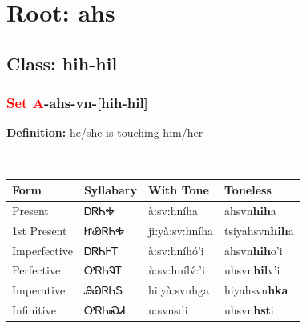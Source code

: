 \needspace{4in}
\section*{Root: ahs}
\nopagebreak
{}
\needspace{3in}
\subsection*{Class: hih-hil}
\nopagebreak
\needspace{2in}
\subsubsection*{\textcolor{Red}{Set A}{-}\textbf{ahs}{-}vn{-}[hih-hil]}
\nopagebreak
\textbf{Definition: } he/she is touching him/her
\\[0.5em]
\begin{tabularx}{\textwidth}{l X X X}%
\toprule%
\textbf{Form}&\textbf{Syllabary}&\textbf{With Tone}&\textbf{Toneless}\\%
\midrule%
Present&ᎠᏒᏂᎭ&à:sv:hníha&ahsvn\textbf{hih}a\\%
1st Present&ᏥᏯᏒᏂᎭ&ji:yà:sv:hníha&tsiyahsvn\textbf{hih}a\\%
Imperfective&ᎠᏒᏂᎰᎢ&à:sv:hníhó’i&ahsvn\textbf{hih}o'i\\%
Perfective&ᎤᏒᏂᎸᎢ&ù:sv:hnílv́:’i&uhsvn\textbf{hil}v'i\\%
Imperative&ᎯᏯᏒᏂᎦ&hi:yà:svnhga&hiyahsvn\textbf{hka}\\%
Infinitive&ᎤᏒᏂᏍᏗ&u:svnsdi&uhsvn\textbf{hst}i\\%
\bottomrule%
\end{tabularx}
\\[1em]